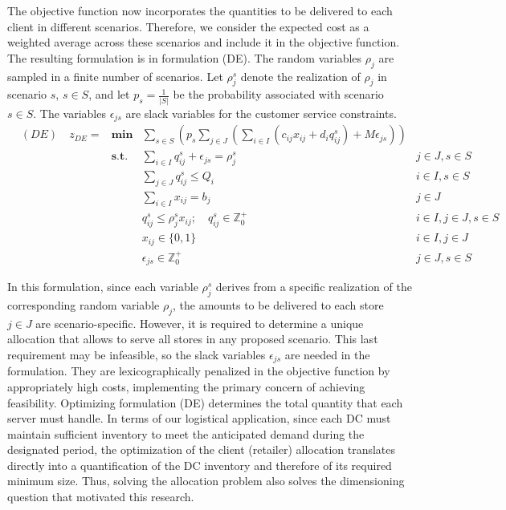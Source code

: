 \documentclass[ijoc,sglanonrev]{informs4}
\begin{document}
The objective function now incorporates the quantities to be delivered to each client in different scenarios. Therefore, we consider the expected cost as a weighted average across these scenarios and include it in the objective function. 
The resulting formulation is in formulation (DE). The random variables $\rho_j$ are sampled in a finite number of scenarios. Let $\rho^s_j$ denote the realization of $\rho_j$ in scenario $s$, $s \in S$, and let $p_s = \frac{1}{|S|}$ be the probability associated with scenario $s \in S$. The variables $\epsilon_{js}$ are slack variables for the customer service constraints.
\begin{align}
	&(DE)\quad z_{DE} = & \textbf{min} &\sum_{s \in S} \left( p_s \sum_{j \in J} \left( \sum_{i \in I} ( c_{ij}x_{ij} + d_i q_{ij}^s) + M \epsilon_{js} \right) \right) \label{DEobj}\\
	& &  \textbf{s.t.}
	& \sum_{i \in I} q_{ij}^s + \epsilon_{js} = \rho_j^s & j \in J, s \in S \label{DErequest}\\
	& &  & \sum_{j \in J}q_{ij}^s \leq Q_i & i \in I, s \in S \label{DEcapacity}\\ 
	& &  & \sum_{i \in I} x_{ij} = b_j & j \in J  \label{DEnumserv}\\
	& &  & q_{ij}^s \leq \rho_j^s x_{ij}; \quad q_{ij}^s \in \mathbb{Z}^+_0 & i \in I, j \in J, s \in S \label{DEcontin}\\
	& &  & x_{ij} \in \{0,1\} & i\in I, j \in J \label{DEx}\\
	& &  & \epsilon_{js} \in \mathbb{Z}^+_0 & j \in J, s \in S \label{DEeps}
\end{align}

In this formulation, since each variable $\rho_j^s$ derives from a specific realization of the corresponding random variable $\rho_j$, the amounts to be delivered to each store $j \in J$ are scenario-specific. However, it is required to determine a unique allocation that allows to serve all stores in any proposed scenario. This last requirement may be infeasible, so the slack variables $\epsilon_{js}$ are needed in the formulation. They are lexicographically penalized in the objective function by appropriately high costs, implementing the primary concern of achieving feasibility.
Optimizing formulation (DE) determines the total quantity that each server must handle. In terms of our logistical application, since each DC must maintain sufficient inventory to meet the anticipated demand during the designated period, the optimization of the client (retailer) allocation translates directly into a quantification of the DC inventory and therefore of its required minimum size. Thus, solving the allocation problem also solves the dimensioning question that motivated this research.
\end{document}
